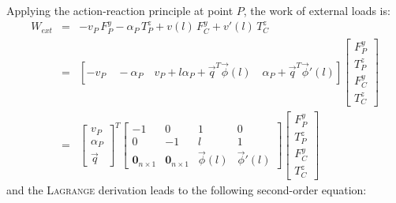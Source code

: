 Applying the action-reaction principle at point $P$, the work of external loads is:
\begin{eqnarray}
W_{ext} & = & -v_P\,F^y_P-\alpha_P\,T^z_P+v(l)\,F^y_C+v'(l)\,T^z_C \\
& = & [-v_P\quad -\alpha_P \quad v_P+l\alpha_P+\vec{q}^T\vec{\phi}(l) \quad \alpha_P+\vec{q}^T\vec{\phi}'(l)]\left[\begin{array}{c}F^y_P \\ T^z_P \\ F^y_C\\ T^z_C\end{array}\right] \\
& = & \left[\begin{array}{c}v_P\\ \alpha_P \\ \vec{q} \end{array}\right]^T\left[\begin{array}{cccc} -1 & 0 & 1 & 0\\0 & -1 & l & 1 \\ \mathbf{0}_{n\times 1} &\mathbf{0}_{n\times 1} & \vec{\phi}(l) & \vec{\phi}'(l) \end{array}\right]\left[\begin{array}{c}F^y_P \\ T^z_P \\ F^y_C\\ T^z_C\end{array}\right]
\end{eqnarray}
and the \textsc{Lagrange} derivation leads to the following second-order equation:
